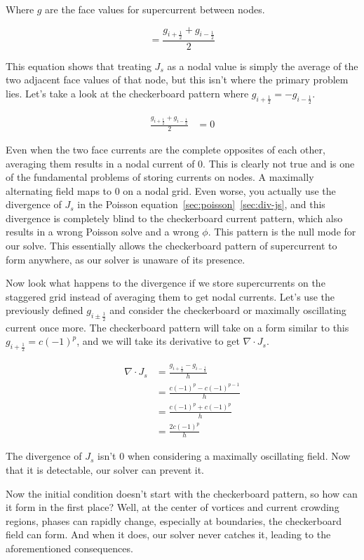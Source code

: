 \documentclass[11pt]{article}
\theoremstyle{definition}
\begin{document}
Where $g$ are the face values for supercurrent between nodes.

\begin{equation}
\label{eq:node-avg}
= \frac{g_{i+\frac{1}{2}} + g_{i-\frac{1}{2}}}{2}
\end{equation}

This equation shows that treating $J_s$ as a nodal value is simply the average of the two adjacent face values of that node, but this isn't where the primary problem lies. Let's take a look at the checkerboard pattern where $g_{i+\frac{1}{2}} = -g_{i-\frac{1}{2}}$.

\begin{align}
\frac{g_{i+\frac{1}{2}} + g_{i-\frac{1}{2}}}{2} &= 0 \label{eq:checker-1}
\end{align}

Even when the two face currents are the complete opposites of each other, averaging them results in a nodal current of 0. This is clearly not true and is one of the fundamental problems of storing currents on nodes. A maximally alternating field maps to 0 on a nodal grid. Even worse, you actually use the divergence of $J_s$ in the Poisson equation~\cref{sec:poisson}~\cref{sec:div-js}, and this divergence is completely blind to the checkerboard current pattern, which also results in a wrong Poisson solve and a wrong $\phi$. This pattern is the null mode for our solve. This essentially allows the checkerboard pattern of supercurrent to form anywhere, as our solver is unaware of its presence.

Now look what happens to the divergence if we store supercurrents on the staggered grid instead of averaging them to get nodal currents. Let's use the previously defined $g_{i \pm \frac{1}{2}}$ and consider the checkerboard or maximally oscillating current once more. The checkerboard pattern will take on a form similar to this $g_{i + \frac{1}{2}} = c(-1)^p$, and we will take its derivative to get $\nabla \cdot J_s$.

\begin{align}
\nabla \cdot J_s &= \frac{g_{i+\frac{1}{2}} - g_{i-\frac{1}{2}}}{h} \label{eq:no-checker-1} \\
&= \frac{c(-1)^p - c(-1)^{p-1}}{h} \label{eq:no-checker-2} \\
&= \frac{c(-1)^p + c(-1)^p}{h} \label{eq:no-checker-3} \\
&= \frac{2c(-1)^p}{h} \label{eq:no-checker-4}
\end{align}

The divergence of $J_s$ isn't 0 when considering a maximally oscillating field. Now that it is detectable, our solver can prevent it.

Now the initial condition doesn't start with the checkerboard pattern, so how can it form in the first place? Well, at the center of vortices and current crowding regions, phases can rapidly change, especially at boundaries, the checkerboard field can form. And when it does, our solver never catches it, leading to the aforementioned consequences.



\end{document}
